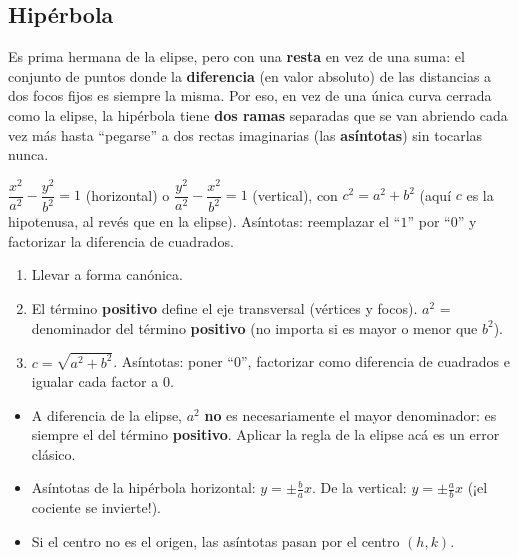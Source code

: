 \documentclass[11pt,a4paper]{article}
\begin{document}
\subsection{Hipérbola}

\begin{intuicion}
Es prima hermana de la elipse, pero con una \textbf{resta} en vez de una suma: el
conjunto de puntos donde la \textbf{diferencia} (en valor absoluto) de las distancias a
dos focos fijos es siempre la misma. Por eso, en vez de una única curva cerrada como la
elipse, la hipérbola tiene \textbf{dos ramas} separadas que se van abriendo cada vez más
hasta ``pegarse'' a dos rectas imaginarias (las \textbf{asíntotas}) sin tocarlas nunca.
\end{intuicion}

\begin{teoria}
$\dfrac{x^2}{a^2}-\dfrac{y^2}{b^2}=1$ (horizontal) o $\dfrac{y^2}{a^2}-\dfrac{x^2}{b^2}=1$
(vertical), con $c^2=a^2+b^2$ (aquí $c$ es la hipotenusa, al revés que en la elipse).
Asíntotas: reemplazar el ``$1$'' por ``$0$'' y factorizar la diferencia de cuadrados.
\end{teoria}

\begin{proc}
\begin{enumerate}
    \item Llevar a forma canónica.
    \item El término \textbf{positivo} define el eje transversal (vértices y focos).
    $a^2$ = denominador del término \textbf{positivo} (no importa si es mayor o menor
    que $b^2$).
    \item $c=\sqrt{a^2+b^2}$. Asíntotas: poner ``0'', factorizar como diferencia de
    cuadrados e igualar cada factor a 0.
\end{enumerate}
\end{proc}

\begin{atencion}
\begin{itemize}
    \item A diferencia de la elipse, $a^2$ \textbf{no} es necesariamente el mayor
    denominador: es siempre el del término \textbf{positivo}. Aplicar la regla de la
    elipse acá es un error clásico.
    \item Asíntotas de la hipérbola horizontal: $y=\pm\frac ba x$. De la vertical:
    $y=\pm\frac ab x$ (¡el cociente se invierte!).
    \item Si el centro no es el origen, las asíntotas pasan por el centro $(h,k)$.
\end{itemize}
\end{atencion}
\end{document}
